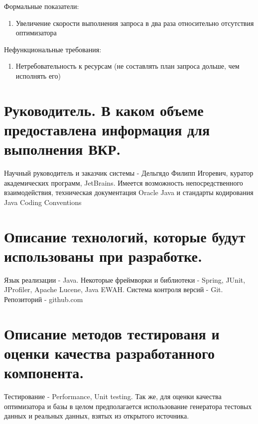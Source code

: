 \documentclass[12pt]{article}
\begin{document}
        Формальные показатели: %
        \begin{enumerate}\itemsep1pt \parskip0pt  
            \item Увеличение скорости выполнения запроса в два раза относительно отсутствия оптимизатора
        \end{enumerate}
        
        Нефункциональные требования: %
        \begin{enumerate}\itemsep1pt \parskip0pt  
            \item Нетребовательность к ресурсам (не составлять план запроса дольше, чем исполнять его)
        \end{enumerate}
    \section{Руководитель. В каком объеме предоставлена информация для выполнения ВКР.}
    	Научный руководитель и заказчик системы - Дельгядо Филипп Игоревич, куратор академических программ, JetBrains. Имеется возможность непосредственного взаимодействия, техническая документация Oracle Java и стандарты кодирования Java Coding Conventions
    \section{Описание технологий, которые будут использованы при разработке.}
        Язык реализации - Java. Некоторые фреймворки и библиотеки - Spring, JUnit, JProfiler, Apache Lucene, Java EWAH. Система контроля версий - Git. Репозиторий - github.com 
    \section{Описание методов тестированя и оценки качества разработанного компонента.}
        Тестирование - Performance, Unit testing. Так же, для оценки качества оптимизатора и базы в целом предполагается использование генератора тестовых данных и реальных данных, взятых из открытого источника.
\end{document}

